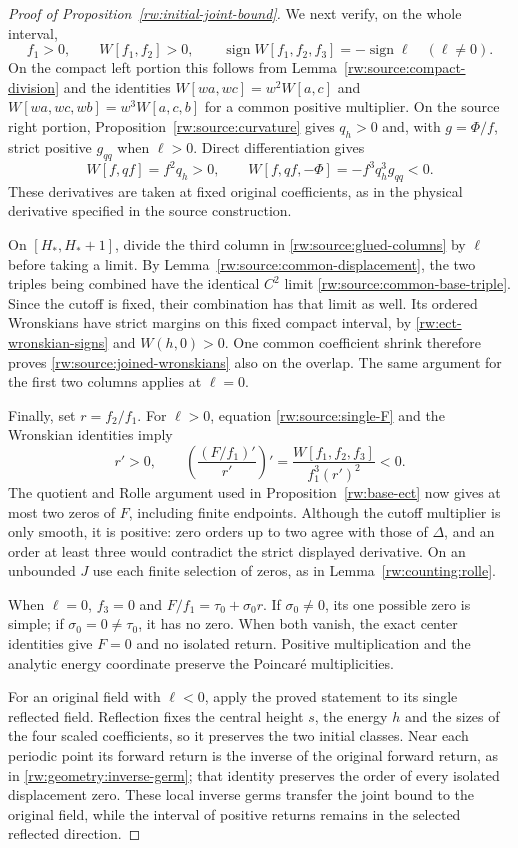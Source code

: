 \begin{proof}[Proof of Proposition~\ref{rw:initial-joint-bound}]
We next verify, on the whole interval,
\begin{equation}\label{rw:source:joined-wronskians}
 f_1>0,\qquad W[f_1,f_2]>0,\qquad
 \operatorname{sign}W[f_1,f_2,f_3]=-\operatorname{sign}\ell
 \quad(\ell\ne0).
\end{equation}
On the compact left portion this follows from
Lemma~\ref{rw:source:compact-division} and the identities
$W[wa,wc]=w^2W[a,c]$ and
$W[wa,wc,wb]=w^3W[a,c,b]$ for a common positive multiplier.
On the source right portion, Proposition~\ref{rw:source:curvature}
gives $q_h>0$ and, with $g=\Phi/f$, strict positive $g_{qq}$
when $\ell>0$. Direct differentiation gives
\[
 W[f,qf]=f^2q_h>0,\qquad
 W[f,qf,-\Phi]=-f^3q_h^3g_{qq}<0.
\]
These derivatives are taken at fixed original coefficients, as in
the physical derivative specified in the source construction.

On $[H_*,H_*+1]$, divide the third column in
\eqref{rw:source:glued-columns} by $\ell$ before taking a limit.
By Lemma~\ref{rw:source:common-displacement}, the two triples being
combined have the identical $C^2$ limit
\eqref{rw:source:common-base-triple}. Since the cutoff is fixed,
their combination has that limit as well. Its ordered Wronskians
have strict margins on this fixed compact interval, by
\eqref{rw:ect-wronskian-signs} and $W(h,0)>0$.
One common coefficient shrink therefore proves
\eqref{rw:source:joined-wronskians} also on the overlap. The same
argument for the first two columns applies at $\ell=0$.

Finally, set $r=f_2/f_1$. For $\ell>0$, equation
\eqref{rw:source:single-F} and the Wronskian identities imply
\[
 r'>0,\qquad
 \left(\frac{(F/f_1)'}{r'}\right)'
 =\frac{W[f_1,f_2,f_3]}{f_1^3(r')^2}<0.
\]
The quotient and Rolle argument used in
Proposition~\ref{rw:base-ect} now gives at most two zeros of $F$,
including finite endpoints. Although the cutoff multiplier is only
smooth, it is positive: zero orders up to two agree with those of
$\Delta$, and an order at least three would contradict the strict
displayed derivative. On an unbounded $J$ use each finite selection
of zeros, as in Lemma~\ref{rw:counting:rolle}.

When $\ell=0$, $f_3=0$ and
$F/f_1=\tau_0+\sigma_0r$. If $\sigma_0\ne0$, its one possible
zero is simple; if $\sigma_0=0\ne\tau_0$, it has no zero.
When both vanish, the exact center identities give $F=0$ and no
isolated return. Positive multiplication and the analytic energy
coordinate preserve the Poincar\'e multiplicities.

For an original field with $\ell<0$, apply the proved statement to
its single reflected field. Reflection fixes the central height $s$,
the energy $h$ and the sizes of the four scaled coefficients, so it
preserves the two initial classes. Near each periodic point its
forward return is the inverse of the original forward return, as in
\eqref{rw:geometry:inverse-germ}; that identity preserves the order
of every isolated displacement zero. These local inverse germs
transfer the joint bound to the original field, while the interval
of positive returns remains in the selected reflected direction.
\end{proof}
